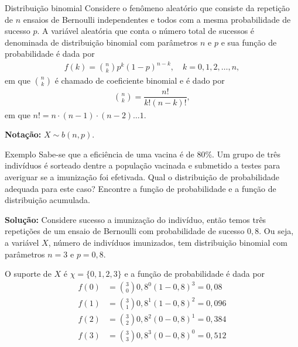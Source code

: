\documentclass[9pt]{beamer}
\begin{document}
\begin{frame}{Distribuição binomial}
Considere o fenômeno aleatório que consiste da repetição de $n$ ensaios de Bernoulli independentes e todos com a mesma probabilidade de sucesso $p$. A variável aleatória que conta o número total de sucessos é denominada de distribuição binomial com parâmetros $n$ e $p$ e sua função de probabilidade é dada por
\begin{align*}
f(k) = \binom{n}{k} p^k (1-p)^{n-k}, \quad k=0,1,2, \dots, n,
\end{align*}
em que $\binom{n}{k}$ é chamado de coeficiente binomial e é dado por
\begin{align*}
\binom{n}{k} = \dfrac{n!}{k! (n-k)!},
\end{align*}
em que $n! = n \cdot (n-1) \cdot (n-2) \dots   1$.

\textbf{Notação:} $X \sim b(n, p)$.
\end{frame}

\begin{frame}{Exemplo}
Sabe-se que a eficiência de uma vacina é de 80\%. Um grupo de três indivíduos é sorteado dentre a população vacinada e submetido a testes para averiguar se a imunização foi efetivada. 
Qual o distribuição de probabilidade adequada para este caso? Encontre a função de probabilidade e a função de distribuição acumulada.
\vfill

\textbf{Solução:} Considere sucesso a imunização do indivíduo, então temos três repetições de um ensaio de Bernoulli com probabilidade de sucesso $0,8$. Ou seja, a variável $X$, número de indivíduos imunizados, tem distribuição binomial com parâmetros $n=3$ e $p=0,8$. 

O suporte de $X$ é $\chi=\{0,1,2,3\}$ e a função de probabilidade é dada por
\begin{align*}
 f(0) &= \binom{3}{0} 0,8^0 (1-0,8)^3 = 0,08\\
 f(1) &= \binom{3}{1} 0,8^1 (1-0,8)^2 = 0,096\\
 f(2) &= \binom{3}{2} 0,8^2 (0-0,8)^1 = 0,384\\
 f(3) &= \binom{3}{3} 0,8^3 (0-0,8)^0 = 0,512\\
\end{align*}
\end{frame}

\end{document}
